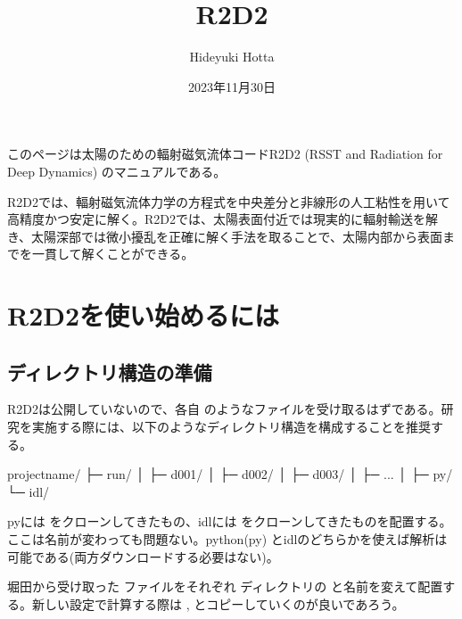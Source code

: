 \documentclass[letterpaper,10pt,dvipdfmx,report]{sphinxmanual}
\title{R2D2}
\date{2023年11月30日}
\author{Hideyuki Hotta}
\let\sphinxpxdimen\pdfpxdimen\else\newdimen\sphinxpxdimen
\begin{document}
\pagestyle{empty}
\sphinxmaketitle
\pagestyle{plain}
\sphinxtableofcontents
\pagestyle{normal}
\label{\detokenize{index::doc}}


\sphinxAtStartPar
このページは太陽のための輻射磁気流体コードR2D2 (RSST and Radiation for Deep Dynamics)
のマニュアルである。

\sphinxAtStartPar
{}

\sphinxAtStartPar
R2D2では、輻射磁気流体力学の方程式を中央差分と非線形の人工粘性を用いて高精度かつ安定に解く。R2D2では、太陽表面付近では現実的に輻射輸送を解き、太陽深部では微小擾乱を正確に解く手法を取ることで、太陽内部から表面までを一貫して解くことができる。

\noindent\sphinxincludegraphics[width=350\sphinxpxdimen]{{R2D2_logo_red}.png}

\sphinxstepscope


\chapter{R2D2を使い始めるには}
\label{\detokenize{start:r2d2}}\label{\detokenize{start::doc}}

\section{ディレクトリ構造の準備}
\label{\detokenize{start:id1}}
\sphinxAtStartPar
R2D2は公開していないので、各自  のようなファイルを受け取るはずである。研究を実施する際には、以下のようなディレクトリ構造を構成することを推奨する。

\begin{sphinxVerbatim}[commandchars=\\\{\}]
project\PYGZus{}name/
           ├─ run/
           │    ├─ d001/
           │    ├─ d002/
           │    ├─ d003/
           │    ├─ ...
           │
           ├─ py/
           └─ idl/
\end{sphinxVerbatim}

\sphinxAtStartPar
pyには  をクローンしてきたもの、idlには  をクローンしてきたものを配置する。ここは名前が変わっても問題ない。python(py) とidlのどちらかを使えば解析は可能である(両方ダウンロードする必要はない)。

\sphinxAtStartPar
堀田から受け取った  ファイルをそれぞれ  ディレクトリの  と名前を変えて配置する。新しい設定で計算する際は ,  とコピーしていくのが良いであろう。
\end{document}
